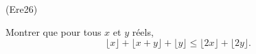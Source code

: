 \begin{tiny}(Ere26)\end{tiny} Montrer que pour tous $x$ et $y$ réels,
\begin{displaymath}
  \lfloor x \rfloor + \lfloor x+y \rfloor + \lfloor y \rfloor \leq \lfloor 2x \rfloor + \lfloor 2y \rfloor .
\end{displaymath}
